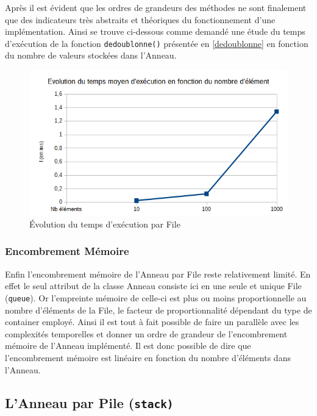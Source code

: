 \documentclass{article}
\newcommand{\info}{\texttt}
\begin{document}
        Après il est évident que les ordres de grandeurs des méthodes ne sont finalement que des indicateurs très abstraits et théoriques du fonctionnement d'une implémentation. Ainsi se trouve ci-dessous comme demandé une étude du temps d'exécution de la fonction \info{dedoublonne()} présentée en \ref{dedoublonne} en fonction du nombre de valeurs stockées dans l'Anneau.
        \begin{figure}[H]
            \begin{center}
                \includegraphics[scale=0.7]{GrapheFile}
                \caption{\label{GrapheFile} Évolution du temps d'exécution par File}
            \end{center}
        \end{figure}
        
        \subsubsection{Encombrement Mémoire}
    
        Enfin l'encombrement mémoire de l'Anneau par File reste relativement limité. En effet le seul attribut de la classe Anneau consiste ici en une seule et unique File (\info{queue}). Or l'empreinte mémoire de celle-ci est plus ou moins proportionnelle au nombre d'éléments de la File, le facteur de proportionnalité dépendant du type de container employé. Ainsi il est tout à fait possible de faire un parallèle avec les complexités temporelles et donner un ordre de grandeur de l'encombrement mémoire de l'Anneau implémenté. Il est donc possible de dire que l'encombrement mémoire est linéaire en fonction du nombre d'éléments dans l'Anneau.
    
    \subsection{L'Anneau par Pile (\info{stack)}}
    
\end{document}
